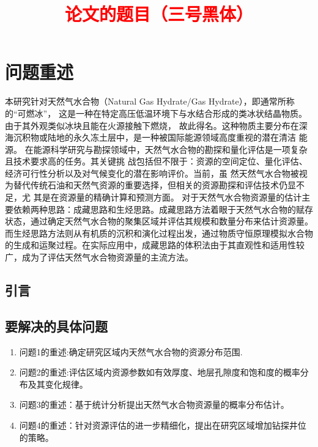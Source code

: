 \documentclass[12pt,a4paper]{nmmcm}
\title{\textcolor{red}{论文的题目（三号黑体）}}
\date{}
\begin{document}
\begin{abstract}
  

  \begin{keywords}
    {\song\xiaosihao
      \textcolor{red}{天然气水合物、资源预测、核密度估计、克里金插值、目标优化问题}
  \end{keywords}

\end{abstract}
\maketitle
\renewcommand{\contentsname}{\centerline{\sanhao\bfseries\HEI 目\quad 录}}
\tableofcontents

\newpage
\setcounter{page}{1}
\pagestyle{fancy}
\section{问题重述}
本研究针对天然气水合物（Natural Gas Hydrate/Gas Hydrate），即通常所称的“可燃冰”，
这是一种在特定高压低温环境下与水结合形成的类冰状结晶物质。由于其外观类似冰块且能在火源接触下燃烧，
故此得名。这种物质主要分布在深海沉积物或陆地的永久冻土层中，是一种被国际能源领域高度重视的潜在清洁
能源。
在能源科学研究与勘探领域中，天然气水合物的勘探和量化评估是一项复杂且技术要求高的任务。其关键挑
战包括但不限于：资源的空间定位、量化评估、经济可行性分析以及对气候变化的潜在影响评价。当前，虽
然天然气水合物被视为替代传统石油和天然气资源的重要选择，但相关的资源勘探和评估技术仍显不足，尤
其是在资源量的精确计算和预测方面。
对于天然气水合物资源量的估计主要依赖两种思路：成藏思路和生烃思路。成藏思路方法着眼于天然气水合物的赋存状态，通过确定天然气水合物的聚集区域并评估其规模和数量分布来估计资源量。而生烃思路方法则从有机质的沉积和演化过程出发，通过物质守恒原理模拟水合物的生成和运聚过程。在实际应用中，成藏思路的体积法由于其直观性和适用性较广，成为了评估天然气水合物资源量的主流方法。



\subsection{引言}


\subsection{要解决的具体问题}
\begin{enumerate}
  \item
        问题1的重述:确定研究区域内天然气水合物的资源分布范围.
  \item
        问题2的重述:评估区域内资源参数如有效厚度、地层孔隙度和饱和度的概率分布及其变化规律。
  \item
        问题3的重述：基于统计分析提出天然气水合物资源量的概率分布估计。
  \item
        问题4的重述：针对资源评估的进一步精细化，提出在研究区域增加钻探井位的策略。
\end{enumerate}
\end{document}
